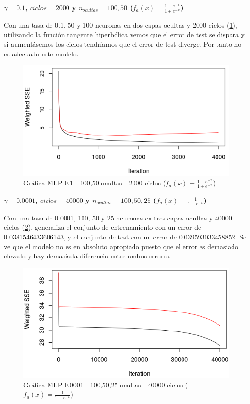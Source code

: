 \documentclass[11pt,spanish,listoffigures,listoftables]{workluis}
\begin{document}
\par \textbf{$\gamma = 0.1$, $ciclos = 2000$ y $n_{ocultas} = 100, 50$ ($f_{a}(x) = \frac{1-e^{-x}}{1+e^{-x}}$)}

\par Con una tasa de 0.1, 50 y 100 neuronas en dos capas ocultas y 2000 ciclos (\ref{fig:10050012000tan}), utilizando la función tangente hiperbólica vemos que el error de test se dispara y si aumentásemos los ciclos tendríamos que el error de test diverge. Por tanto no es adecuado este modelo.

\begin{figure}[H]
\centering
\includegraphics[scale=0.5]{10050012000tan}
\caption{Gráfica MLP 0.1 - 100,50 ocultas - 2000 ciclos ($f_{a}(x) = \frac{1-e^{-x}}{1+e^{-x}}$)}\label{fig:10050012000tan}
\end{figure}

\par \textbf{$\gamma = 0.0001$, $ciclos = 40000$ y $n_{ocultas} = 100, 50, 25$ ($f_{a}(x) = \frac{1}{1+e^{-x}}$)}

\par Con una tasa de 0.0001, 100, 50 y 25 neuronas en tres capas ocultas y 40000 ciclos (\ref{fig:10050250000140000sig}), generaliza el conjunto de entrenamiento con un error de 0.0381546433606143, y el conjunto de test con un error de 0.039593033458852. Se ve que el modelo no es en absoluto apropiado puesto que el error es demasiado elevado y hay demasiada diferencia entre ambos errores.


\begin{figure}[H]
\centering
\includegraphics[scale=0.5]{10050250000140000sig}
\caption{Gráfica MLP 0.0001 - 100,50,25 ocultas - 40000 ciclos ($f_{a}(x) = \frac{1}{1+e^{-x}}$)}\label{fig:10050250000140000sig}
\end{figure}
\end{document}
